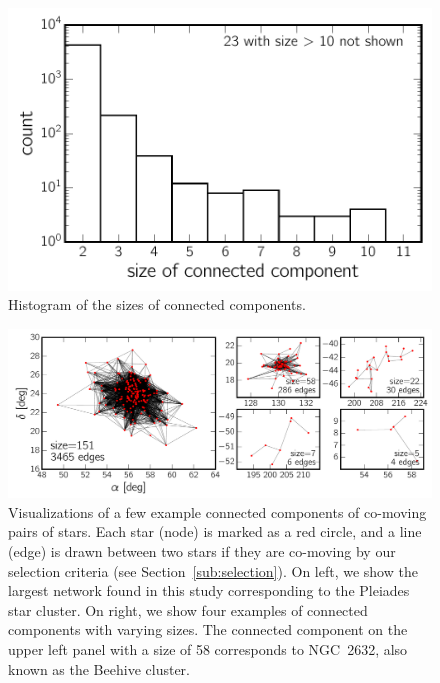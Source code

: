 \documentclass[manuscript, letterpaper]{aastex6}
\newcommand{\sectionname}{Section}
\begin{document}
\begin{figure}[htbp]
  \begin{center}
    \includegraphics[width=\linewidth]{figures/dist_networksize.pdf}
  \end{center}
  \caption{%
    Histogram of the sizes of connected components.
    \label{fig:hist_ccsize}}
\end{figure}

\begin{figure}[htbp]
  \begin{center}
    \includegraphics[width=\textwidth]{figures/graphviz_examples.pdf}
  \end{center}
  \caption{%
    Visualizations of a few example connected components of co-moving pairs of stars.
    Each star (node) is marked as a red circle, and a line (edge) is drawn
    between two stars if they are co-moving by our selection criteria
    (see \sectionname~\ref{sub:selection}). On left, we show the largest network
    found in this study corresponding to the Pleiades star cluster.
    On right, we show four examples of connected components with varying sizes.
    The connected component on the upper left panel with a size of 58 corresponds
    to NGC~2632, also known as the Beehive cluster.
    \label{fig:graphviz_examples}}
\end{figure}
\end{document}
